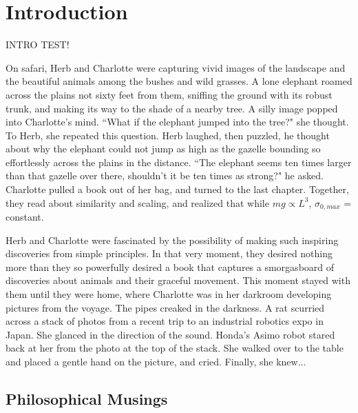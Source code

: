 \chapter{Introduction}
\label{sec:Introduction}

INTRO TEST!

On safari, Herb and Charlotte were capturing vivid images of the landscape and the beautiful animals among the bushes and wild grasses. A lone elephant roamed across the plains not sixty feet from them, sniffing the ground with its robust trunk, and making its way to the shade of a nearby tree. A silly image popped into Charlotte's mind. ``What if the elephant jumped into the tree?" she thought. To Herb, she repeated this question. Herb laughed, then puzzled, he thought about why the elephant could not jump as high as the gazelle bounding so effortlessly across the plains in the distance. ``The elephant seems ten times larger than that gazelle over there, shouldn't it be ten times as strong?" he asked. Charlotte pulled a book \cite{mcmahon84} out of her bag, and turned to the last chapter. Together, they read about similarity and scaling, and realized that while $mg \propto L^{3}$, $\sigma_{0, max}$ = constant.

Herb and Charlotte were fascinated by the possibility of making such inspiring discoveries from simple principles. In that very moment, they desired nothing more than they so powerfully desired a book that captures a smorgasboard of discoveries about animals and their graceful movement. This moment stayed with them until they were home, where Charlotte was in her darkroom developing pictures from the voyage. The pipes creaked in the darkness. A rat scurried across a stack of photos from a recent trip to an industrial robotics expo in Japan. She glanced in the direction of the sound. Honda's Asimo robot stared back at her from the photo at the top of the stack. She walked over to the table and placed a gentle hand on the picture, and cried. Finally, she knew...

\section{Philosophical Musings}

